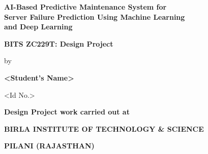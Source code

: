 \documentclass[12pt,letterpaper]{report}
\begin{document}
\begin{titlepage}
\centering
\vspace*{0.5in}

{\Large\bfseries AI-Based Predictive Maintenance System for\\[6pt]
Server Failure Prediction Using Machine Learning\\[6pt]
and Deep Learning}

\vspace{0.4in}

{\large\bfseries BITS ZC229T: Design Project}

\vspace{0.3in}

{\large by}

\vspace{0.2in}

{\large\bfseries <Student's Name>}

{\large <Id No.>}

\vspace{0.3in}

{\large\bfseries Design Project work carried out at}

\vspace{0.1in}

{\large\bfseries <Name of the Employing Organization, Location>}

\vspace{0.5in}

\fbox{\begin{minipage}{1.07in}
  \centering
  \vspace{0.4in}
  {\scriptsize BITS LOGO}
  \vspace{0.4in}
\end{minipage}}

\vspace{0.4in}

{\large\bfseries BIRLA INSTITUTE OF TECHNOLOGY \& SCIENCE}

{\large\bfseries PILANI (RAJASTHAN)}

\vspace{0.3in}

{}

\end{titlepage}
\end{document}
